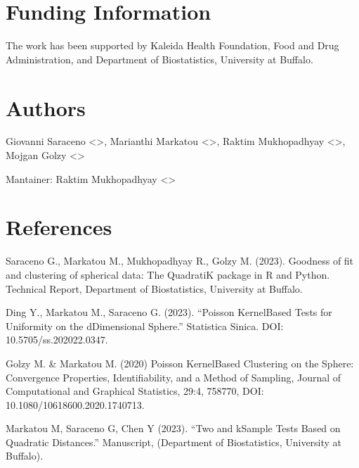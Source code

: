 \documentclass[letterpaper,10pt,english,openany,oneside]{sphinxmanual}
\begin{document}
\section{Funding Information}
\label{\detokenize{index:funding-information}}
\sphinxAtStartPar
The work has been supported by Kaleida Health Foundation, Food and Drug Administration, and Department of Biostatistics, University at Buffalo.


\section{Authors}
\label{\detokenize{index:authors}}
\sphinxAtStartPar
Giovanni Saraceno \textless{}\textgreater{}, Marianthi Markatou \textless{}\textgreater{}, Raktim Mukhopadhyay \textless{}\textgreater{}, Mojgan Golzy \textless{}\textgreater{}

\sphinxAtStartPar
Mantainer: Raktim Mukhopadhyay \textless{}\textgreater{}


\section{References}
\label{\detokenize{index:references}}
\sphinxAtStartPar
Saraceno G., Markatou M., Mukhopadhyay R., Golzy M. (2023). Goodness of\sphinxhyphen{}
fit and clustering of spherical data: The QuadratiK package in R and Python. Technical Report, Department of Biostatistics, University at Buffalo.

\sphinxAtStartPar
Ding Y., Markatou M., Saraceno G. (2023). “Poisson Kernel\sphinxhyphen{}Based Tests for
Uniformity on the d\sphinxhyphen{}Dimensional Sphere.” Statistica Sinica. DOI: 10.5705/ss.202022.0347.

\sphinxAtStartPar
Golzy M. \& Markatou M. (2020) Poisson Kernel\sphinxhyphen{}Based Clustering on the Sphere:
Convergence Properties, Identifiability, and a Method of Sampling, Journal of Computational and
Graphical Statistics, 29:4, 758\sphinxhyphen{}770, DOI: 10.1080/10618600.2020.1740713.

\sphinxAtStartPar
Markatou M, Saraceno G, Chen Y (2023). “Two\sphinxhyphen{} and k\sphinxhyphen{}Sample Tests Based on Quadratic Distances.”
Manuscript, (Department of Biostatistics, University at Buffalo).
\end{document}
